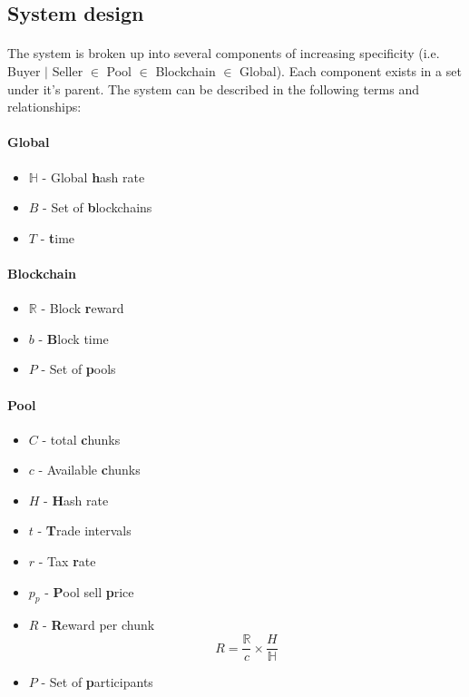\subsection{System design} %

\paragraph{} The system is broken up into several components of increasing specificity (i.e. Buyer $|$ Seller $\in$ Pool $\in$ Blockchain $\in$ Global). Each component exists in a set under it's parent. The system can be described in the following terms and relationships:

\paragraph{Global} 

\begin{itemize}
  \item $\mathbb{H}$ - Global \textbf{h}ash rate
  \item $B$ - Set of \textbf{b}lockchains
  \item $T$ - \textbf{t}ime
\end{itemize}

\paragraph{Blockchain}

\begin{itemize}
  \item $\mathbb{R}$ - Block \textbf{r}eward
  \item $b$ - \textbf{B}lock time
  \item $P$ - Set of \textbf{p}ools
\end{itemize}

\paragraph{Pool}

\begin{itemize}
  \item $C$ - total \textbf{c}hunks
  \item $c$ - Available \textbf{c}hunks
  \item $H$ - \textbf{H}ash rate
  \item $t$ - \textbf{T}rade intervals 
  \item $r$ - Tax \textbf{r}ate
  \item $p_{p}$ - \textbf{P}ool sell \textbf{p}rice
  \item $R$ - \textbf{R}eward per chunk 
    \begin{equation} \label{equation:chunkreward}
      R = \frac{\mathbb{R}}{c} \times \frac{H}{\mathbb{H}}
    \end{equation}
  \item $P$ - Set of \textbf{p}articipants
\end{itemize}


